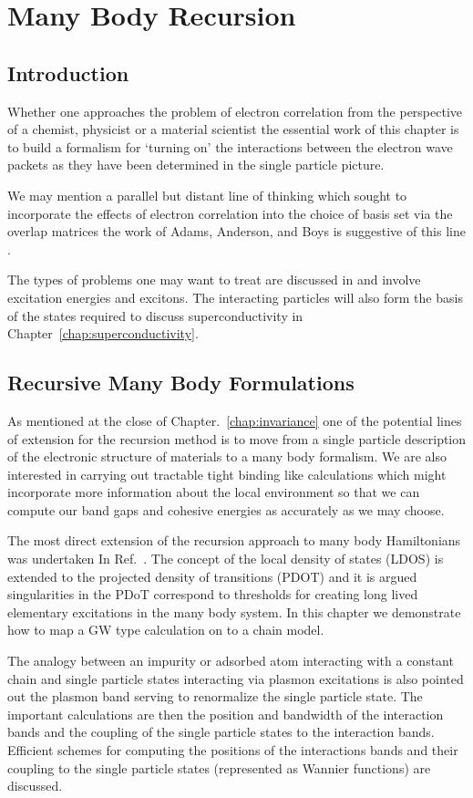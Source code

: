 \chapter{Many Body Recursion}
\section{Introduction}
Whether one approaches the problem of electron correlation from the
perspective of a chemist, physicist or a material scientist the 
essential work of this chapter is to build a formalism for `turning on'
the interactions between the electron wave packets as they have been 
determined in the single particle picture. 

We may mention a parallel but distant line of thinking
which sought to incorporate the effects of electron correlation
into the choice of basis set via the overlap matrices the work
of Adams, Anderson, and Boys is suggestive of this 
line \cite{adams62, weeks73}. 

The types of problems one may want to treat are discussed in \cite{slater49, kittel54}
and involve excitation energies and excitons. The interacting particles will also 
form the basis of the states required to discuss superconductivity 
in Chapter~\ref{chap:superconductivity}.

\section{Recursive Many Body Formulations}
As mentioned at the close of Chapter.~\ref{chap:invariance} one of the potential
lines of extension for the recursion method is to move from a single particle 
description of the electronic structure of materials to a many body formalism.
We are also interested in carrying out tractable tight binding like calculations
which might incorporate more information about the local environment so that we
can compute our band gaps and cohesive energies as accurately as we may choose.

The most direct extension of the recursion approach to many body Hamiltonians 
was undertaken In Ref.~\cite{annett94}. The concept of the local density of states (LDOS)
is extended to the projected density of transitions (PDOT) and it is argued singularities
in the PDoT correspond to thresholds for creating long lived elementary excitations 
in the many body system. In this chapter we demonstrate how to map a GW type calculation
on to a chain model. 

The analogy between an impurity or adsorbed atom interacting with
a constant chain and single particle states interacting via plasmon excitations is 
also pointed out the plasmon band serving to renormalize the single particle state.
The important calculations are then the position and bandwidth of the interaction
bands and the coupling of the single particle states to the interaction bands.
Efficient schemes for computing the positions of the interactions bands and 
their coupling to the single particle states (represented as Wannier functions)
are discussed.

